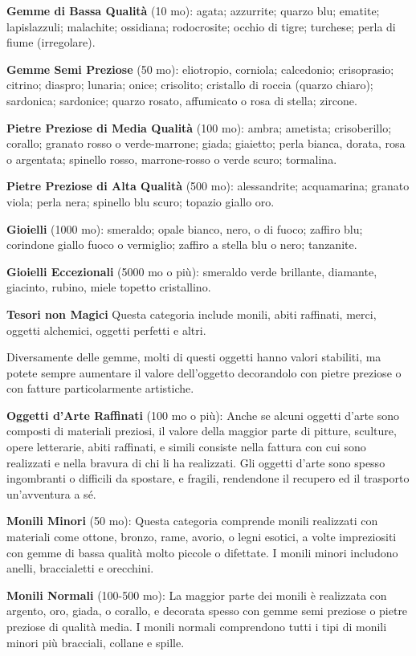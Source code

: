 \begin{multicols}{2}
\textbf{Gemme di Bassa Qualità} (10 mo): agata; azzurrite; quarzo blu; ematite; lapislazzuli; malachite; ossidiana; rodocrosite; occhio di tigre; turchese; perla di fiume (irregolare).

\textbf{Gemme Semi Preziose} (50 mo): eliotropio, corniola; calcedonio; crisoprasio; citrino; diaspro; lunaria; onice; crisolito; cristallo di roccia (quarzo chiaro); sardonica; sardonice; quarzo rosato, affumicato o rosa di stella; zircone.

\textbf{Pietre Preziose di Media Qualità} (100 mo): ambra; ametista; crisoberillo; corallo; granato rosso o verde-marrone; giada; giaietto; perla bianca, dorata, rosa o argentata; spinello rosso, marrone-rosso o verde scuro; tormalina.

\textbf{Pietre Preziose di Alta Qualità} (500 mo): alessandrite; acquamarina; granato viola; perla nera; spinello blu scuro; topazio giallo oro.

\textbf{Gioielli} (1000 mo): smeraldo; opale bianco, nero, o di fuoco; zaffiro blu; corindone giallo fuoco o vermiglio; zaffiro a stella blu o nero; tanzanite.

\textbf{Gioielli Eccezionali} (5000 mo o più): smeraldo verde brillante, diamante, giacinto, rubino, miele topetto cristallino.

\textbf{Tesori non Magici} Questa categoria include monili, abiti raffinati, merci, oggetti alchemici, oggetti perfetti e altri.

Diversamente delle gemme, molti di questi oggetti hanno valori stabiliti, ma potete sempre aumentare il valore dell'oggetto decorandolo con pietre preziose o con fatture particolarmente artistiche.

\textbf{Oggetti d'Arte Raffinati} (100 mo o più): Anche se alcuni oggetti d'arte sono composti di materiali preziosi, il valore della maggior parte di pitture, sculture, opere letterarie, abiti raffinati, e simili consiste nella fattura con cui sono realizzati e nella bravura di chi li ha realizzati. Gli oggetti d'arte sono spesso ingombranti o difficili da spostare, e fragili, rendendone il recupero ed il trasporto un'avventura a sé.

\textbf{Monili Minori} (50 mo): Questa categoria comprende monili realizzati con materiali come ottone, bronzo, rame, avorio, o legni esotici, a volte impreziositi con gemme di bassa qualità molto piccole o difettate. I monili minori includono anelli, braccialetti e orecchini.

\textbf{Monili Normali} (100-500 mo): La maggior parte dei monili è realizzata con argento, oro, giada, o corallo, e decorata spesso con gemme semi preziose o pietre preziose di qualità media. I monili normali comprendono tutti i tipi di monili minori più bracciali, collane e spille.


\end{multicols}
